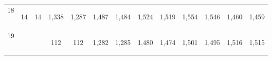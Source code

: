 \begin{center}
\begin{tabular}{lcccccccccccc}
18 & \begin{bf}14\end{bf} & \begin{rm}14\end{rm} & \begin{bf}1,338\end{bf} & \begin{rm}1,287\end{rm} & \begin{bf}1,487\end{bf} & \begin{rm}1,484\end{rm} & \begin{bf}1,524\end{bf} & \begin{rm}1,519\end{rm} & \begin{bf}1,554\end{bf} & \begin{rm}1,546\end{rm} & \begin{bf}1,460\end{bf} & \begin{rm}1,459\end{rm}\\
19 & \begin{bf}\end{bf} & \begin{rm}\end{rm} & \begin{bf}112\end{bf} & \begin{rm}112\end{rm} & \begin{bf}1,282\end{bf} & \begin{rm}1,285\end{rm} & \begin{bf}1,480\end{bf} & \begin{rm}1,474\end{rm} & \begin{bf}1,501\end{bf} & \begin{rm}1,495\end{rm} & \begin{bf}1,516\end{bf} & \begin{rm}1,515\end{rm}\\

\end{tabular}
\end{center}
